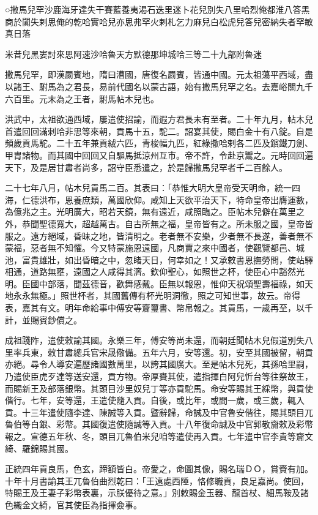
\begin{pinyinscope}
○撒馬兒罕沙鹿海牙達失干賽藍養夷渴石迭里迷卜花兒別失八里哈烈俺都淮八答黑商於闐失剌思俺的乾哈實哈兒亦思弗罕火剌札乞力麻兒白松虎兒答兒密納失者罕敏真日落

米昔兒黑婁討來思阿速沙哈魯天方默德那坤城哈三等二十九部附魯迷

撒馬兒罕，即漢罽賓地，隋曰漕國，唐復名罽賓，皆通中國。元太祖蕩平西域，盡以諸王、駙馬為之君長，易前代國名以蒙古語，始有撒馬兒罕之名。去嘉峪關九千六百里。元末為之王者，駙馬帖木兒也。

洪武中，太祖欲通西域，屢遣使招諭，而遐方君長未有至者。二十年九月，帖木兒首遣回回滿剌哈非思等來朝，貢馬十五，駝二。詔宴其使，賜白金十有八錠。自是頻歲貢馬駝。二十五年兼貢絨六匹，青梭幅九匹，紅綠撒哈剌各二匹及鑌鐵刀劍、甲胄諸物。而其國中回回又自驅馬抵涼州互市。帝不許，令赴京鬻之。元時回回遍天下，及是居甘肅者尚多，詔守臣悉遣之，於是歸撒馬兒罕者千二百餘人。

二十七年八月，帖木兒貢馬二百。其表曰：「恭惟大明大皇帝受天明命，統一四海，仁德洪布，恩養庶類，萬國欣仰。咸知上天欲平治天下，特命皇帝出膺運數，為億兆之主。光明廣大，昭若天鏡，無有遠近，咸照臨之。臣帖木兒僻在萬里之外，恭聞聖德寬大，超越萬古。自古所無之福，皇帝皆有之。所未服之國，皇帝皆服之。遠方絕域，昏昧之地，皆清明之。老者無不安樂，少者無不長遂，善者無不蒙福，惡者無不知懼。今又特蒙施恩遠國，凡商賈之來中國者，使觀覽都邑、城池，富貴雄壯，如出昏暗之中，忽睹天日，何幸如之！又承敕書恩撫勞問，使站驛相通，道路無壅，遠國之人咸得其濟。欽仰聖心，如照世之杯，使臣心中豁然光明。臣國中部落，聞茲德音，歡舞感戴。臣無以報恩，惟仰天祝頌聖壽福祿，如天地永永無極。」照世杯者，其國舊傳有杯光明洞徹，照之可知世事，故云。帝得表，嘉其有文。明年命給事中傅安等齎璽書、幣帛報之。其貢馬，一歲再至，以千計，並賜賓鈔償之。

成祖踐阼，遣使敕諭其國。永樂三年，傅安等尚未還，而朝廷聞帖木兒假道別失八里率兵東，敕甘肅總兵官宋晟儆備。五年六月，安等還。初，安至其國被留，朝貢亦絕。尋令人導安遍歷諸國數萬里，以誇其國廣大。至是帖木兒死，其孫哈里嗣，乃遣使臣虎歹達等送安還，貢方物。帝厚賚其使，遣指揮白阿兒忻台等往祭故王，而賜新王及部落銀幣。其頭目沙里奴兒丁等亦貢駝馬。命安等賜其王綵幣，與貢使偕行。七年，安等還，王遣使隨入貢。自後，或比年，或間一歲，或三歲，輒入貢。十三年遣使隨李達、陳誠等入貢。暨辭歸，命誠及中官魯安偕往，賜其頭目兀魯伯等白銀、彩幣。其國復遣使隨誠等入貢。十八年復命誠及中官郭敬齎敕及彩幣報之。宣德五年秋、冬，頭目兀魯伯米兒咱等遣使再入貢。七年遣中官李貴等齎文綺、羅錦賜其國。

正統四年貢良馬，色玄，蹄額皆白。帝愛之，命圖其像，賜名瑞ＤＯ，賞賚有加。十年十月書諭其王兀魯伯曲烈乾曰：「王遠處西陲，恪修職貢，良足嘉尚。使回，特賜王及王妻子彩幣表裏，示朕優待之意。」別敕賜金玉器、龍首杖、細馬鞍及諸色織金文綺，官其使臣為指揮僉事。


\end{pinyinscope}
